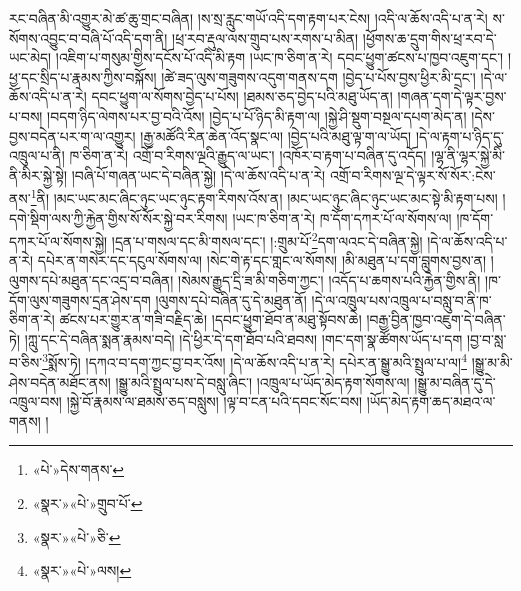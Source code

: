 རང་བཞིན་མི་འགྱུར་མེ་ཚ་ཆུ་གྲང་བཞིན། །ས་སྲ་རླུང་གཡོ་འདི་དག་རྟག་པར་ངེས། །འདི་ལ་ཆོས་འདི་པ་ན་རེ། ས་སོགས་འབྱུང་བ་བཞི་པོ་འདི་དག་ནི། །ཕྲ་རབ་རྡུལ་ལས་གྲུབ་པས་རགས་པ་མིན། །ཕྱོགས་ཆ་དྲུག་གིས་ཕྲ་རབ་དེ་ཡང་མེད། །འཇིག་པ་གསུམ་གྱིས་དངོས་པོ་འདི་མི་རྟག །ཡང་ཁ་ཅིག་ན་རེ། དབང་ཕྱུག་ཚངས་པ་ཁྱབ་འཇུག་དང་། །ཕྱ་དང་སྲིད་པ་རྣམས་ཀྱིས་བསྐོས། །ཚེ་ཟད་ལུས་གཟུགས་འདུག་གནས་དག །བྱེད་པ་པོས་བྱས་ཕྱིར་མི་དྲང་། །དེ་ལ་ཆོས་འདི་པ་ན་རེ། དབང་ཕྱུག་ལ་སོགས་བྱེད་པ་པོས། །ཐམས་ཅད་བྱེད་པའི་མཐུ་ཡོད་ན། །གཞན་དག་དེ་ལྟར་བྱས་པ་བས། །བདག་ཉིད་ལེགས་པར་བྱ་བའི་འོས། །བྱེད་པ་པོ་ཉིད་མི་རྟག་ལ། །སྐྱེ་ཤི་སྡུག་བསྔལ་དཔག་མེད་ན། །དེས་བྱས་བདེན་པར་ག་ལ་འགྱུར། །རྒྱ་མཚོའི་རིན་ཆེན་འོད་སྣང་ལ། །བྱེད་པའི་མཐུ་ལྟ་ག་ལ་ཡོད། །དེ་ལ་རྟག་པ་ཉིད་དུ་འཁྲུལ་པ་ནི། ཁ་ཅིག་ན་རེ། འགྲོ་བ་རིགས་ལྔའི་རྒྱུད་ལ་ཡང་། །འཁོར་བ་རྟག་པ་བཞིན་དུ་འདོད། །ལྷ་ནི་ལྷར་སྐྱེ་མི་ནི་མིར་སྐྱེ་སྟེ། །བཞི་པོ་གཞན་ཡང་དེ་བཞིན་སྐྱེ། །དེ་ལ་ཆོས་འདི་པ་ན་རེ། འགྲོ་བ་རིགས་ལྔ་དེ་ལྟར་སོ་སོར་:ངེས་ནས་\footnote{«པེ་»དེས་གནས་}ནི། །མང་ཡང་མང་ཞིང་ཉུང་ཡང་ཉུང་རྟག་རིགས་འོས་ན། །མང་ཡང་ཉུང་ཞིང་ཉུང་ཡང་མང་སྟེ་མི་རྟག་པས། །དགེ་སྡིག་ལས་ཀྱི་རྐྱེན་གྱིས་སོ་སོར་སྐྱེ་བར་རིགས། །ཡང་ཁ་ཅིག་ན་རེ། ཁ་དོག་དཀར་པོ་ལ་སོགས་ལ། །ཁ་དོག་དཀར་པོ་ལ་སོགས་སྐྱེ། །དྲན་པ་གསལ་དང་མི་གསལ་དང་། །:གྲུམ་པོ་\footnote{«སྣར་»«པེ་»གྲུབ་པོ་}དག་ལའང་དེ་བཞིན་སྐྱེ། །དེ་ལ་ཆོས་འདི་པ་ན་རེ། དཔེར་ན་གསེར་དང་དངུལ་སོགས་ལ། །སེང་གེ་རྟ་དང་གླང་ལ་སོགས། །མི་མཐུན་པ་དག་བླུགས་བྱས་ན། །ལུགས་དཔེ་མཐུན་དང་འདྲ་བ་བཞིན། །སེམས་རྒྱུད་དྲི་ཟ་མི་གཅིག་ཀྱང་། །འདོད་པ་ཆགས་པའི་རྐྱེན་གྱིས་ནི། །ཁ་དོག་ལུས་གཟུགས་དྲན་ཤེས་དག །ལུགས་དཔེ་བཞིན་དུ་དེ་མཐུན་ནོ། །དེ་ལ་འཁྲུལ་པས་འཁྲུལ་པ་བསླུ་བ་ནི་ཁ་ཅིག་ན་རེ། ཚངས་པར་གྱུར་ན་གཟི་བརྗིད་ཆེ། །དབང་ཕྱུག་ཐོབ་ན་མཐུ་སྟོབས་ཆེ། །བརྒྱ་བྱིན་ཁྱབ་འཇུག་དེ་བཞིན་ཏེ། །ཀླུ་དང་དེ་བཞིན་སྨན་རྣམས་བདེ། །དེ་ཕྱིར་དེ་དག་ཐོབ་པའི་ཐབས། །གང་དག་སྣ་ཚོགས་ཡོད་པ་དག །བྱ་བ་སླ་བ་ཅིས་\footnote{«སྣར་»«པེ་»ཅི་}སྨོས་ཏེ། །དཀའ་བ་དག་ཀྱང་བྱ་བར་འོས། །དེ་ལ་ཆོས་འདི་པ་ན་རེ། དཔེར་ན་སྒྱུ་མའི་སྤྲུལ་པ་ལ།\footnote{«སྣར་»«པེ་»ལས།} །སྒྱུ་མ་མི་ཤེས་བདེན་མཐོང་ནས། །སྒྱུ་མའི་སྤྲུལ་པས་དེ་བསླུ་ཞིང་། །འཁྲུལ་པ་ཡོད་མེད་རྟག་སོགས་ལ། །སྒྱུ་མ་བཞིན་དུ་དེ་འཁྲུལ་བས། །སྐྱེ་བོ་རྣམས་ལ་ཐམས་ཅད་བསླུས། །ལྟ་བ་ངན་པའི་དབང་སོང་བས། །ཡོད་མེད་རྟག་ཆད་མཐའ་ལ་གནས། །
